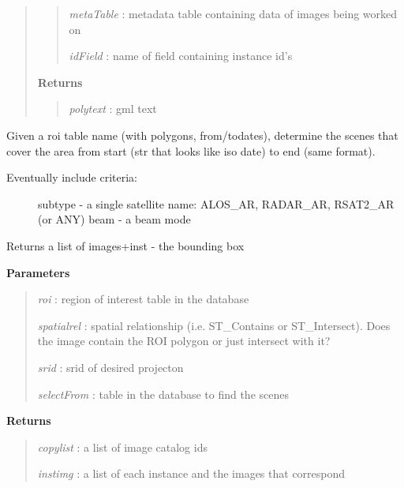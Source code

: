 \documentclass[letterpaper,10pt,openany,oneside]{sphinxmanual}
\begin{document}
\begin{fulllineitems}
\begin{fulllineitems}
\begin{quote}
\begin{quote}
\emph{metaTable}  : metadata table containing data of images being worked on

\emph{idField}    : name of field containing instance id's
\end{quote}

\textbf{Returns}
\begin{quote}

\emph{polytext}  :   gml text
\end{quote}
\end{quote}

\end{fulllineitems}


\begin{fulllineitems}
\label{code:Database.Database.qrySelectFromAvailable}
Given a roi table name (with polygons, from/todates), determine the scenes that cover the area
from start (str that looks like iso date) to end (same format).
\begin{description}
\item[{Eventually include criteria:}] \leavevmode
subtype - a single satellite name: ALOS\_AR, RADAR\_AR, RSAT2\_AR (or ANY)        
beam - a beam mode

\end{description}

Returns a list of images+inst - the bounding box

\textbf{Parameters}
\begin{quote}

\emph{roi}        : region of interest table in the database

\emph{spatialrel} : spatial relationship (i.e. ST\_Contains or ST\_Intersect).  Does the image contain the ROI polygon or just intersect with it?

\emph{srid}       : srid of desired projecton

\emph{selectFrom} : table in the database to find the scenes
\end{quote}

\textbf{Returns}
\begin{quote}

\emph{copylist} : a list of image catalog ids

\emph{instimg}  : a list of each instance and the images that correspond
\end{quote}


\end{fulllineitems}
\end{fulllineitems}
\end{document}

